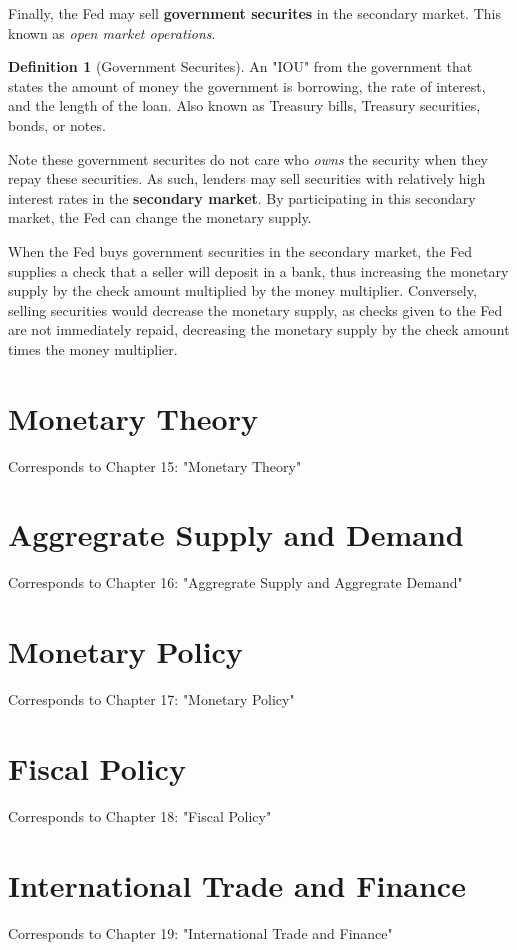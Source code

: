 \documentclass[12pt, a4paper]{article}
\theoremstyle{definition}
\newtheorem{definition}{Definition}
\begin{document}
Finally, the Fed may sell \textbf{government securites} in the secondary market. This known as \textit{open market operations}.
\begin{definition}[Government Securites]
    An "IOU" from the government that states the amount of money the government is borrowing, the rate of interest, and the length of the loan.
    Also known as Treasury bills, Treasury securities, bonds, or notes.
\end{definition}

Note these government securites do not care who \textit{owns} the security when they repay these securities.
As such, lenders may sell securities with relatively high interest rates in the \textbf{secondary market}.
By participating in this secondary market, the Fed can change the monetary supply.

When the Fed buys government securities in the secondary market, the Fed supplies a check that a seller will deposit in a bank, thus increasing the monetary supply by the check amount multiplied by the money multiplier.
Conversely, selling securities would decrease the monetary supply, as checks given to the Fed are not immediately repaid, decreasing the monetary supply by the check amount times the money multiplier.


\newpage

\section{Monetary Theory}
Corresponds to Chapter 15: "Monetary Theory"

\newpage

\section{Aggregrate Supply and Demand}
Corresponds to Chapter 16: "Aggregrate Supply and Aggregrate Demand"

\newpage

\section{Monetary Policy}
Corresponds to Chapter 17: "Monetary Policy"

\newpage

\section{Fiscal Policy}
Corresponds to Chapter 18: "Fiscal Policy"

\newpage

\section{International Trade and Finance}
Corresponds to Chapter 19: "International Trade and Finance"

\newpage
\end{document}
